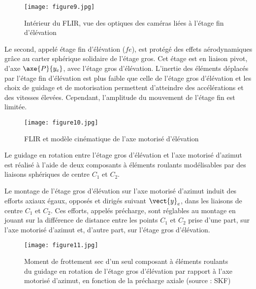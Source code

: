 \begin{figure}[h]
\begin{center}
\texttt{[image: figure9.jpg]}
\caption{Intérieur du FLIR, vue des optiques des caméras liées à l'étage fin d'élévation\label{fig9}}
\end{center}
\end{figure}


Le second, appelé étage fin d'élévation ($fe$), est protégé des effets aérodynamiques grâce au carter sphérique solidaire de l'étage gros. Cet étage est en liaison pivot, d'axe $\axe{P}{{y_e}}$, avec l'étage gros d'élévation. L'inertie des éléments déplacés par l'étage fin d'élévation est plus faible que celle de l'étage gros d'élévation et les choix de guidage et de motorisation permettent d'atteindre des accélérations et des vitesses élevées. Cependant, l'amplitude du mouvement de l'étage fin est limitée.

\begin{figure}[!htb]
\begin{center}
\texttt{[image: figure10.jpg]}
\caption{FLIR et modèle cinématique de l'axe motorisé d'élévation \label{figure10}}
\end{center}
\end{figure}

Le guidage en rotation entre l'étage gros d'élévation et l'axe motorisé d'azimut est réalisé à l'aide de deux
composants à éléments roulants modélisables par des liaisons sphériques de centre $C_1$ et $C_2$.


Le montage de l'étage gros d'élévation sur l'axe motorisé
d'azimut induit des efforts axiaux égaux, opposés
et dirigés suivant $\vect{y}_e$, dans les liaisons de centre
$C_1$ et $C_2$. Ces efforts, appelés précharge, sont réglables
au montage en jouant sur la différence de distance
entre les points $C_1$ et $C_2$ prise d'une part, sur
l'axe motorisé d'azimut et, d'autre part, sur l'étage
gros d'élévation.


\begin{figure}[h]
\begin{center}
\texttt{[image: figure11.jpg]}
\caption{Moment de frottement sec d'un seul composant à éléments roulants du guidage en rotation de l'étage
gros d'élévation par rapport à l'axe motorisé d'azimut, en fonction de la précharge axiale (source : SKF)\label{fig11}}
\end{center}
\end{figure}

